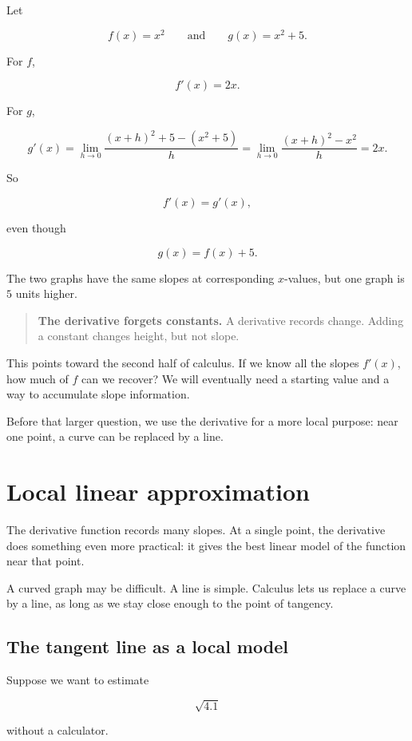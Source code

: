 Let

\[
f(x)=x^2
\qquad\text{and}\qquad
g(x)=x^2+5.
\]

For \(f\),

\[
f'(x)=2x.
\]

For \(g\),

\[
g'(x)
=
\lim_{h\to0}\frac{(x+h)^2+5-(x^2+5)}{h}
=
\lim_{h\to0}\frac{(x+h)^2-x^2}{h}
=
2x.
\]

So

\[
f'(x)=g'(x),
\]

even though

\[
g(x)=f(x)+5.
\]

The two graphs have the same slopes at corresponding \(x\)-values, but one graph is \(5\) units higher.

\begin{quote}
\textbf{The derivative forgets constants.}
A derivative records change.  Adding a constant changes height, but not slope.
\end{quote}

This points toward the second half of calculus.  If we know all the slopes \(f'(x)\), how much of \(f\) can we recover?  We will eventually need a starting value and a way to accumulate slope information.

Before that larger question, we use the derivative for a more local purpose: near one point, a curve can be replaced by a line.

\section{Local linear approximation}
\label{sec:local-linear-approximation}

The derivative function records many slopes.  At a single point, the derivative does something even more practical: it gives the best linear model of the function near that point.

A curved graph may be difficult.  A line is simple.  Calculus lets us replace a curve by a line, as long as we stay close enough to the point of tangency.

\subsection{The tangent line as a local model}
\label{subsec:tangent-line-local-model}

Suppose we want to estimate

\[
\sqrt{4.1}
\]

without a calculator.

